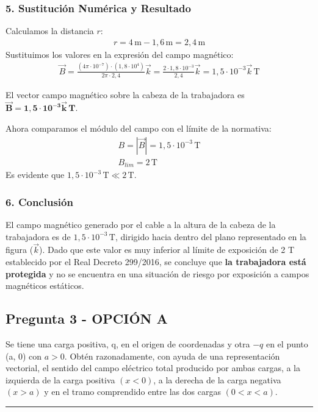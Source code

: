 \subsubsection*{5. Sustitución Numérica y Resultado}
Calculamos la distancia $r$:
\begin{gather}
    r = 4 \, \text{m} - 1,6 \, \text{m} = 2,4 \, \text{m}
\end{gather}
Sustituimos los valores en la expresión del campo magnético:
\begin{gather}
    \vec{B} = \frac{(4\pi \cdot 10^{-7}) \cdot (1,8 \cdot 10^4)}{2\pi \cdot 2,4} \vec{k} = \frac{2 \cdot 1,8 \cdot 10^{-3}}{2,4} \vec{k} = 1,5 \cdot 10^{-3} \vec{k} \, \text{T}
\end{gather}
\begin{cajaresultado}
    El vector campo magnético sobre la cabeza de la trabajadora es $\boldsymbol{\vec{B} = 1,5 \cdot 10^{-3} \vec{k} \, \textbf{T}}$.
\end{cajaresultado}
\medskip
Ahora comparamos el módulo del campo con el límite de la normativa:
\begin{gather}
    B = |\vec{B}| = 1,5 \cdot 10^{-3} \, \text{T} \\
    B_{lim} = 2 \, \text{T}
\end{gather}
Es evidente que $1,5 \cdot 10^{-3} \, \text{T} \ll 2 \, \text{T}$.

\subsubsection*{6. Conclusión}
\begin{cajaconclusion}
El campo magnético generado por el cable a la altura de la cabeza de la trabajadora es de $1,5 \cdot 10^{-3}\,\text{T}$, dirigido hacia dentro del plano representado en la figura ($\vec{k}$). Dado que este valor es muy inferior al límite de exposición de 2 T establecido por el Real Decreto 299/2016, se concluye que \textbf{la trabajadora está protegida} y no se encuentra en una situación de riesgo por exposición a campos magnéticos estáticos.
\end{cajaconclusion}
\newpage

\subsection{Pregunta 3 - OPCIÓN A}
\label{subsec:3A_2025_jun_ord}

\begin{cajaenunciado}
Se tiene una carga positiva, q, en el origen de coordenadas y otra $-q$ en el punto (a, 0) con $a>0$. Obtén razonadamente, con ayuda de una representación vectorial, el sentido del campo eléctrico total producido por ambas cargas, a la izquierda de la carga positiva $(x<0)$, a la derecha de la carga negativa $(x>a)$ y en el tramo comprendido entre las dos cargas $(0<x<a)$.
\end{cajaenunciado}
\hrule


